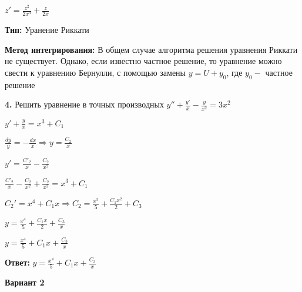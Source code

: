 \documentclass[a4paper]{article}
\begin{document}
\vspace{0.3cm}

$\displaystyle z'=\frac{z^2}{2x^3}+\frac{z}{2x}$

\vspace{0.3cm}

\textbf{Тип: } Уранение Риккати

\textbf{Метод интегрирования: } В общем случае алгоритма решения уравнения Риккати не существует. Однако, если известно частное решение, то уравнение можно свести к уравнению Бернулли, с помощью замены $\displaystyle y=U+y_0$, где $\displaystyle y_0 - $ частное решение

\vspace{1cm}

\textbf{4.} Решить уравнение в точных производных $\displaystyle y''+\frac{y'}{x}-\frac{y}{x^2}=3x^2$

\vspace{0.3cm}

$\displaystyle y'+\frac{y}{x}=x^3+C_1$

\vspace{0.3cm}

$\displaystyle \frac{dy}{y}=-\frac{dx}{x} \Rightarrow y=\frac{C_2}{x}$

\vspace{0.3cm}

$\displaystyle y'=\frac{C'_2}{x} - \frac{C_2}{x^2}$

\vspace{0.3cm}

$\displaystyle \frac{C'_2}{x}-\frac{C_2}{x^2}+\frac{C_2}{x^2}=x^3+C_1$

\vspace{0.3cm}

$\displaystyle C_2'=x^4+C_1x \Rightarrow C_2=\frac{x^5}{5} + \frac{C_1 x^2}{2}+C_3$ 

\vspace{0.3cm}

$\displaystyle y=\frac{x^4}{5}+\frac{C_1x}{2}+\frac{C_3}{x}$ 

\vspace{0.3cm}

$\displaystyle y=\frac{x^4}{5}+C_1x+\frac{C_3}{x}$ 

\vspace{0.3cm}

\textbf{Ответ: } $\displaystyle y=\frac{x^4}{5}+C_1x+\frac{C_3}{x}$

\vspace{2cm}

\begin{center}
  \textbf{Вариант 2}
\end{center}
\end{document}
